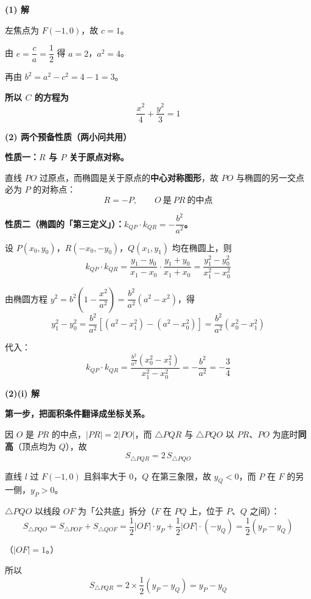 \textbf{(1) 解}

左焦点为 $F(-1,0)$，故 $c=1$。

由 $e=\dfrac ca=\dfrac12$ 得 $a=2$，$a^2=4$。

再由 $b^2=a^2-c^2=4-1=3$。

\textbf{所以 $C$ 的方程为}
\[\frac{x^2}{4}+\frac{y^2}{3}=1\]

\par\medskip

\textbf{(2) 两个预备性质（两小问共用）}

\textbf{性质一：$R$ 与 $P$ 关于原点对称。}

直线 $PO$ 过原点，而椭圆是关于原点的\textbf{中心对称图形}，故 $PO$ 与椭圆的另一交点必为 $P$ 的对称点：
\[R=-P,\qquad O\ \text{是}\ PR\ \text{的中点}\]

\textbf{性质二（椭圆的「第三定义」）：$k_{QP}\cdot k_{QR}=-\dfrac{b^2}{a^2}$。}

设 $P(x_0,y_0)$，$R(-x_0,-y_0)$，$Q(x_1,y_1)$ 均在椭圆上，则
\[k_{QP}\cdot k_{QR}=\frac{y_1-y_0}{x_1-x_0}\cdot\frac{y_1+y_0}{x_1+x_0}=\frac{y_1^2-y_0^2}{x_1^2-x_0^2}\]

由椭圆方程 $y^2=b^2\left(1-\dfrac{x^2}{a^2}\right)=\dfrac{b^2}{a^2}\left(a^2-x^2\right)$，得
\[y_1^2-y_0^2=\frac{b^2}{a^2}\left[\left(a^2-x_1^2\right)-\left(a^2-x_0^2\right)\right]=\frac{b^2}{a^2}\left(x_0^2-x_1^2\right)\]

代入：
\[k_{QP}\cdot k_{QR}=\frac{\frac{b^2}{a^2}\left(x_0^2-x_1^2\right)}{x_1^2-x_0^2}=-\frac{b^2}{a^2}=-\frac34\]

\par\medskip

\textbf{(2)(i) 解}

\textbf{第一步，把面积条件翻译成坐标关系。}

因 $O$ 是 $PR$ 的中点，$|PR|=2|PO|$，而 $\triangle PQR$ 与 $\triangle PQO$ 以 $PR$、$PO$ 为底时\textbf{同高}（顶点均为 $Q$），故
\[S_{\triangle PQR}=2\,S_{\triangle PQO}\]

直线 $l$ 过 $F(-1,0)$ 且斜率大于 $0$，$Q$ 在第三象限，故 $y_Q<0$，而 $P$ 在 $F$ 的另一侧，$y_P>0$。

$\triangle PQO$ 以线段 $OF$ 为「公共底」拆分（$F$ 在 $PQ$ 上，位于 $P$、$Q$ 之间）：
\[S_{\triangle PQO}=S_{\triangle POF}+S_{\triangle QOF}=\frac12|OF|\cdot y_P+\frac12|OF|\cdot\left(-y_Q\right)=\frac12\left(y_P-y_Q\right)\]

（$|OF|=1$。）

所以
\[S_{\triangle PQR}=2\times\frac12\left(y_P-y_Q\right)=y_P-y_Q\]

